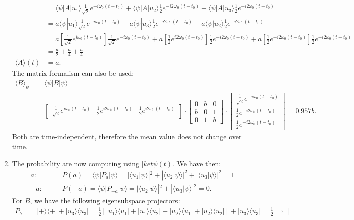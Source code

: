 \documentclass[letterpaper,11pt,twoside]{article}
\newcommand{\ket}[1]{|#1\rangle}
\newcommand{\bra}[1]{\langle#1|}
\newcommand{\braket}[1]{\langle#1\rangle}
\begin{document}
\begin{enumerate}[itemsep=0pt,topsep=0pt,label=\alph*.]
\begin{align*}
    &=\braket{\psi|A|u_1}\frac{1}{\sqrt{2}}e^{-i\omega_0(t-t_0)}+\braket{\psi|A|u_2}\frac{1}{2}e^{-i2\omega_0(t-t_0)}+\braket{\psi|A|u_3}\frac{1}{2}e^{-i2\omega_0(t-t_0)}\\
    &=a\braket{\psi|u_1}\frac{1}{\sqrt{2}}e^{-i\omega_0(t-t_0)}+a\braket{\psi|u_3}\frac{1}{2}e^{-i2\omega_0(t-t_0)}+a\braket{\psi|u_2}\frac{1}{2}e^{-i2\omega_0(t-t_0)}\\
    &=a\left[\frac{1}{\sqrt{2}}e^{i\omega_0(t-t_0)}\right]\frac{1}{\sqrt{2}}e^{-i\omega_0(t-t_0)}+a\left[\frac{1}{2}e^{i2\omega_0(t-t_0)}\right]\frac{1}{2}e^{-i2\omega_0(t-t_0)}+a\left[\frac{1}{2}e^{-i2\omega_0(t-t_0)}\right]\frac{1}{2}e^{-i2\omega_0(t-t_0)}\\
    &=\frac{a}{2}+\frac{a}{4}+\frac{a}{4}\\
    \braket{A}(t)&=a.
  \end{align*}
  The matrix formalism can also be used:
  \begin{align*}
    \braket{B}_\psi&=\braket{\psi|B|\psi}\\
    &=\begin{bmatrix}
      \frac{1}{\sqrt{2}}e^{i\omega_0(t-t_0)}&\frac{1}{2}e^{i2\omega_0(t-t_0)}&\frac{1}{2}e^{i2\omega_0(t-t_0)}
    \end{bmatrix}\cdot\begin{bmatrix}
      0&b&0\\
      b&0&1\\
      0&1&b
    \end{bmatrix}\cdot\begin{bmatrix}
      \frac{1}{\sqrt{2}}e^{-i\omega_0(t-t_0)}\\\frac{1}{2}e^{-i2\omega_0(t-t_0)}\\\frac{1}{2}e^{-i2\omega_0(t-t_0)}
    \end{bmatrix}=0.957b.
  \end{align*}
  Both are time-independent, therefore the mean value does not change over time.
  \item The probability are now computing using $|ket{\psi(t)}$. We have then:
  \begin{align*}
    a:&\qquad P(a)=\braket{\psi|P_a|\psi}=|\braket{u_1|\psi}|^2+|\braket{u_2|\psi}|^2+|\braket{u_3|\psi}|^2=1\\
    -a:&\qquad P(-a)=\braket{\psi|P_{-a}|\psi}=|\braket{u_2|\psi}|^2+|\braket{u_3|\psi}|^2=0.
  \end{align*}
  For $B$, we have the following eigensubspace projectors:
  \begin{align*}
    P_{b}&=\ket{+}\bra{+}+\ket{u_3}\bra{u_3}=\frac{1}{2}[\ket{u_1}\bra{u_1}+\ket{u_1}\bra{u_2}+\ket{u_2}\bra{u_1}+\ket{u_2}\bra{u_2}]+\ket{u_3}\bra{u_3}=\frac{1}{2}\begin{bmatrix},

\end{bmatrix}
\end{align*}
\end{enumerate}
\end{document}
